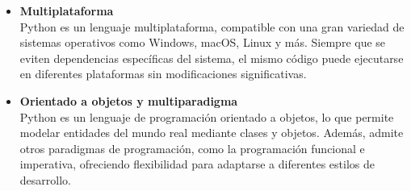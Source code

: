\begin{justify}
\begin{itemize}
        \item \textbf{Multiplataforma}\\
        Python es un lenguaje multiplataforma, compatible con una gran variedad de sistemas operativos como Windows, macOS, Linux y más. Siempre que
        se eviten dependencias específicas del sistema, el mismo código puede ejecutarse en diferentes plataformas sin modificaciones significativas.
        
        \item \textbf{Orientado a objetos y multiparadigma}\\
        Python es un lenguaje de programación orientado a objetos, lo que permite modelar entidades del mundo real mediante clases y objetos. Además,
        admite otros paradigmas de programación, como la programación funcional e imperativa, ofreciendo flexibilidad para adaptarse a diferentes estilos
        de desarrollo.
    \end{itemize}
\end{justify}